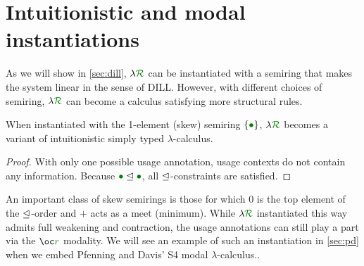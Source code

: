 \documentclass[submission,copyright,creativecommons]{eptcs}
\begin{document}


\section{Intuitionistic and modal instantiations}\label{sec:general}

As we will show in \autoref{sec:dill}, $\name$ can be instantiated with
a semiring that makes the system linear in the sense of DILL.
However, with different choices of semiring, $\name$ can become a calculus
satisfying more structural rules.

\begin{lemma}
  When instantiated with the 1-element (skew) semiring
  $\{\rescomment{\bullet}\}$, $\name$ becomes a variant of intuitionistic
  simply typed $\lambda$-calculus.
\end{lemma}
\begin{proof}
  With only one possible usage annotation, usage contexts do not contain any
  information.
  Because $\rescomment{\bullet} \subres \rescomment{\bullet}$, all
  $\trianglelefteq$-constraints are satisfied.
\end{proof}

An important class of skew semirings is those for which $0$ is the top
element of the $\trianglelefteq$-order and $+$ acts as a meet (minimum).
While $\name$ instantiated this way admits full weakening and
contraction, the usage annotations can still play a part via the
$\excl{r}{}$ modality.  We will see an example of such an
instantiation in \autoref{sec:pd} when we embed Pfenning and Davis' S4
modal $\lambda$-calculus..
\end{document}
